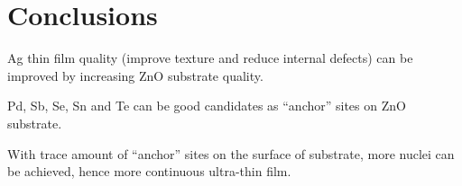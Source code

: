 \section{Conclusions}

Ag thin film quality (improve texture and reduce internal defects) can be improved by increasing ZnO substrate quality.

Pd, Sb, Se, Sn and Te can be good candidates as ``anchor'' sites on ZnO substrate.

With trace amount of ``anchor'' sites on the surface of substrate, more nuclei can be achieved, hence more continuous ultra-thin film.
